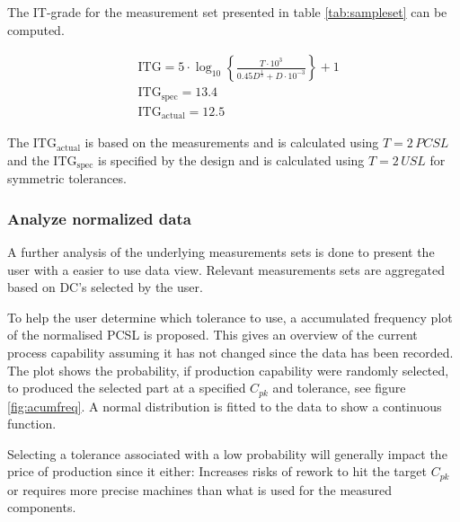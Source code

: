 \documentclass[aip,amsmath, preprint, author-year]{revtex4-1}
\begin{document}
The IT-grade for the measurement set presented in table \ref{tab:sampleset} can be computed.

\begin{align*}
&\mathrm{ITG} = 5 \cdot \log_{10} \left\{ \frac{T \cdot 10^3}{ 0.45  D^{\frac{1}{3}} + D \cdot10^{-3} }\right\} +1 \\
&\mathrm{ITG_{spec} }= 13.4 \\
&\mathrm{ITG_{actual}} = 12.5
\end{align*}

The $\mathrm{ITG_{actual}}$ is based on the measurements  and is calculated using $T = 2 \, PCSL$ and the $\mathrm{ITG_{spec}}$ is specified by the design and is calculated using $T = 2 \,USL$ for symmetric tolerances. 

\subsubsection{Analyze normalized data}
A further analysis of the underlying measurements sets is done to present the user with a easier to use data view. 
Relevant measurements sets are aggregated based on DC's selected by the user. 

To help the user determine which tolerance to use, a accumulated frequency plot of the normalised PCSL is proposed. 
This gives an overview of the current process capability assuming it has not changed since the data has been recorded. 
The plot shows the probability, if production capability were randomly selected, to produced the selected part at a specified $C_{pk}$ and tolerance, see figure \ref{fig:acumfreq}. 
A normal distribution is fitted to the data to show a continuous function.

Selecting a tolerance associated with a low probability will generally impact the price of production since it either: 
Increases risks of rework to hit the target $C_{pk}$ or requires more precise machines than what is used for the measured components.
\end{document}
